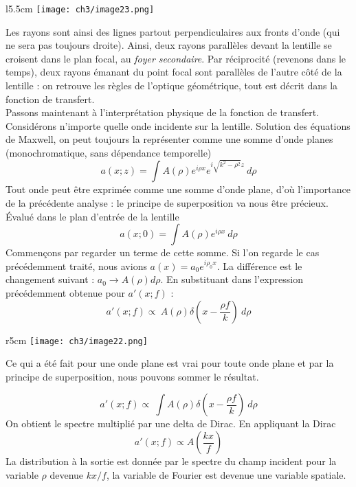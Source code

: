 	\begin{wrapfigure}[9]{l}{5.5cm}
	\vspace{-5mm}
	\texttt{[image: ch3/image23.png]}
	\end{wrapfigure}
Les rayons sont ainsi des lignes partout perpendiculaires aux fronts d'onde (qui ne sera pas toujours 
droite). Ainsi, deux rayons parallèles devant la lentille se croisent dans le plan focal, au \textit{foyer secondaire}. 
Par réciprocité (revenons dans le temps), deux rayons émanant du point focal sont parallèles de l'autre côté de la 
lentille : on retrouve les règles de l'optique géométrique, tout est décrit dans la fonction de transfert.\\

Passons maintenant à l'interprétation physique de la fonction de transfert. Considérons n'importe quelle 
onde incidente sur la lentille. Solution des équations de Maxwell, on peut toujours la représenter comme
une somme d'onde planes (monochromatique, sans dépendance temporelle)
\begin{equation}
a(x;z) = \int A(\rho)e^{i\rho x}e^{i\sqrt{k^2-\rho^2}z}\ d\rho
\end{equation}
Tout onde peut être exprimée comme une somme d'onde plane, d'où l'importance de la précédente analyse : 
le principe de superposition va nous être précieux. Évalué dans le plan d'entrée de la lentille 
\begin{equation}
a(x;0) = \int A(\rho)e^{i\rho x}\ d\rho
\end{equation}
Commençons par regarder un terme de cette somme. Si l'on regarde le cas précédemment traité, nous 
avions $a(x) = a_0 e^{i\rho_0x}$. La différence est le changement suivant : $a_0\rightarrow A(\rho)d\rho$.
En substituant dans l'expression précédemment obtenue pour $a'(x;f)$ :
\begin{equation}
a'(x;f) \propto\ A(\rho)\delta\left(x-\frac{\rho f}{k}\right)\ d\rho
\end{equation}

	\begin{wrapfigure}[10]{r}{5cm}
	\vspace{-5mm}
	\texttt{[image: ch3/image22.png]}
	\end{wrapfigure}
Ce qui a été fait pour une onde plane est vrai pour toute onde plane et par la principe de superposition, 
nous pouvons sommer le résultat. 

\begin{equation}
a'(x;f) \propto\ \int A(\rho)\delta\left(x-\frac{\rho f}{k}\right)\ d\rho
\end{equation}
On obtient le spectre multiplié par une delta de Dirac. En appliquant la Dirac
\begin{equation}
a'(x;f) \propto A\left(\dfrac{kx}{f}\right)
\end{equation}
La distribution à la sortie est donnée par le spectre du champ incident pour la variable $\rho$ devenue 
$kx/f$, la variable de Fourier est devenue une variable spatiale.\\

